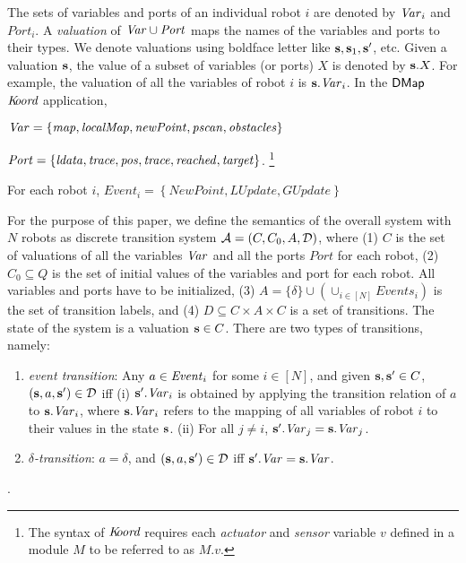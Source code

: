 %
The sets of variables and ports of an individual robot $i$ are denoted by $\mathit{Var}_i$ and  $\mathit{Port}_i$.
%
A {\em valuation\/} of $\mathit{Var} \cup \mathit{Port}$ maps the names of the variables and ports to their types.
We denote valuations using boldface letter like ${\textbf{s}}, {\textbf{s}}_1, {\textbf{s}}'$, etc.
%
Given a valuation ${\textbf{s}}$, the value of a subset of  variables (or ports) $X$ is denoted by ${\textbf{s}}.X$. For example, the  valuation of all the variables of robot $i$ is ${\textbf{s}}.\mathit{Var}_i$.
%
%
In the ${\sf DMap}$ $\emph{K\kern-2pt oord}$ application,
\begin{inparaenum}
\item $\mathit{Var} = \left\{ \mathit{map}, \mathit{localMap}, \mathit{newPoint}, \mathit{pscan}, \mathit{obstacles} \right\}$
\item $\mathit{Port} = \left\{\mathit{ldata}, \mathit{trace}, \mathit{pos}, \mathit{trace}, \mathit{reached}, \mathit{target} \right\}$. \footnote{The syntax of $\emph{K\kern-2pt oord}$ requires each \emph{actuator} and \emph{sensor} variable $v$ defined in a module $M$ to be referred to as $M.v$.}
\item For each robot $i$, $\mathit{Event}_i = \left\{ \mathit{NewPoint}, \mathit{LUpdate}, \mathit{GUpdate}\right\}$
\end{inparaenum}
%
%
For the purpose of this paper, we define the  semantics of the overall system with $N$ robots as discrete transition system $\mathcal{A} = (C, C_0, A, \mathcal{D})$,
where
(1) $C$ is the set of valuations of all the variables $\mathit{Var}$ and all the ports $\mathit{Port}$ for each robot,
(2) $C_0 \subseteq Q$ is the set of initial values of the variables and port for each robot. All variables and ports have to be initialized,
(3) $A = \{\delta\} \cup \left( \cup_{i \in [N]} \mathit{Events}_i \right)$ is the set of transition labels, and
(4) $D \subseteq C \times A \times C$ is a set of transitions. The state of the system is a valuation ${\textbf{s}} \in C$. There are two types of transitions, namely:
\begin{enumerate}
	\item {\em event transition}: Any $a \in \mathit{Event}_i$ for some $i \in [N]$, and  given ${\textbf{s}}, {\textbf{s}}'\in C$,   $({\textbf{s}},a,{\textbf{s}}') \in \mathcal{D}$ iff (i) ${\textbf{s}}'.\mathit{Var}_i$ is obtained by applying the transition relation of $a$ to ${\textbf{s}}.\mathit{Var}_i$, where ${\textbf{s}}.\mathit{Var}_i$ refers to the mapping of all variables of robot $i$ to their values in the state ${\textbf{s}}$.
		(ii) For all $j \neq i$,
		${\textbf{s}}'.\mathit{Var}_j = {\textbf{s}}.\mathit{Var}_j$.
	\item {\em $\delta$-transition}: $a = \delta$, and $({\textbf{s}},a,{\textbf{s}}') \in \mathcal{D}$ iff ${\textbf{s}}'.\mathit{Var} = {\textbf{s}}.\mathit{Var}$.
\end{enumerate}
.


